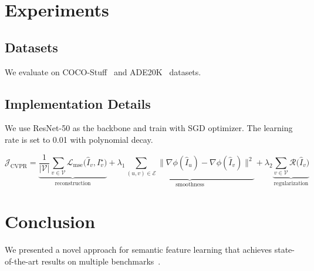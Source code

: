 \documentclass[conference]{IEEEtran}
\begin{document}
\section{Experiments}

\subsection{Datasets}

We evaluate on COCO-Stuff~\cite{cocostuff} and ADE20K~\cite{ade20k} datasets.

\subsection{Implementation Details}

We use ResNet-50 as the backbone and train with SGD optimizer.
The learning rate is set to 0.01 with polynomial decay.

\begin{equation}
\mathcal{J}_{\text{CVPR}} =
\underbrace{\frac{1}{|\mathcal{V}|}\sum_{v\in\mathcal{V}}
  \mathcal{L}_{\text{mse}}\bigl(\hat{I}_v, I_v^\star\bigr)}_{\text{reconstruction}}
+ \lambda_1\underbrace{\sum_{(u,v)\in\mathcal{E}}
  \bigl\|\nabla\phi(\hat{I}_u)-\nabla\phi(\hat{I}_v)\bigr\|^2}_{\text{smoothness}}
+ \lambda_2\underbrace{\sum_{v\in\mathcal{V}}
  \mathcal{R}\bigl(\hat{I}_v\bigr)}_{\text{regularization}} \label{eq:cvpr-energy}
\end{equation}

\begin{table}[t]
\centering
\caption{Quantitative results on COCO-Stuff validation set.}
\label{tab:quant}
\end{table}

\section{Conclusion}

We presented a novel approach for semantic feature learning that achieves
state-of-the-art results on multiple benchmarks~\cite{darknet,yolov4,solo,condinst}.



\end{document}
